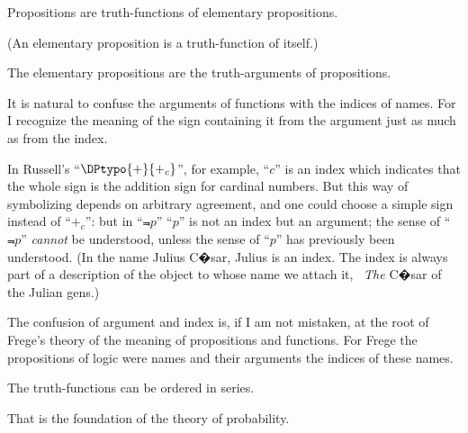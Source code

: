 {Propositions are truth-functions of elementary
propositions.

(An elementary proposition is a truth-function
of itself.)}


{The elementary propositions are the truth-arguments
of propositions.}


{It is natural to confuse the arguments of
functions with the indices of names. For I
recognize the meaning of the sign containing it
from the argument just as much as from the
index.

In Russell's ``$\DPtypo{+}{+_{c}}$'', for example, ``$c$'' is an
index which indicates that the whole sign is the
addition sign for cardinal numbers. But this way
of symbolizing depends on arbitrary agreement,
and one could choose a simple sign instead of
``$+_{c}$'': but in ``$\Not{p}$'' ``$p$'' is not an index but
an argument; the sense of ``$\Not{p}$'' \emph{cannot} be understood,
unless the sense of ``$p$'' has previously been
understood. (In the name Julius C�sar, Julius is
an index. The index is always part of a description
of the object to whose name we attach it, \exempliGratia\ \emph{The}
C�sar of the Julian gens.)

The confusion of argument and index is, if I
am not mistaken, at the root of Frege's theory
of the meaning of propositions and functions. For
Frege the propositions of logic were names and
their arguments the indices of these names.}


{The truth-functions can be ordered in
series.

That is the foundation of the theory of probability.}
\enlargethispage{-9pt} %

